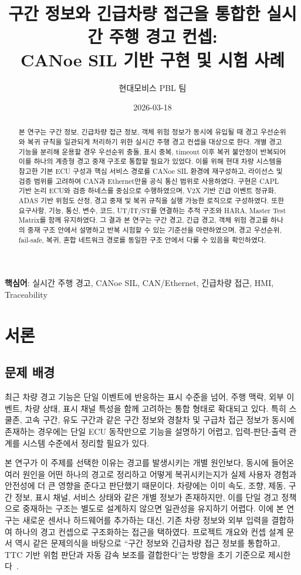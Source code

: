 \documentclass[10pt,a4paper,twocolumn]{article}
\title{구간 정보와 긴급차량 접근을 통합한 실시간 주행 경고 컨셉:\\CANoe SIL 기반 구현 및 시험 사례}
\author{현대모비스 PBL 팀}
\date{2026-03-18}
\begin{document}
\maketitle

\begin{abstract}
본 연구는 구간 정보, 긴급차량 접근 정보, 객체 위험 정보가 동시에 유입될 때 경고 우선순위와 복귀 규칙을 일관되게 처리하기 위한 실시간 주행 경고 컨셉을 대상으로 한다. 개별 경고 기능을 분리해 운용할 경우 우선순위 충돌, 표시 중복, timeout 이후 복귀 불안정이 반복되어 이를 하나의 계층형 경고 중재 구조로 통합할 필요가 있었다. 이를 위해 현대 차량 시스템을 참고한 기본 ECU 구성과 핵심 서비스 경로를 CANoe SIL 환경에 재구성하고, 라이선스 및 검증 범위를 고려하여 CAN과 Ethernet만을 공식 통신 범위로 사용하였다. 구현은 CAPL 기반 논리 ECU와 검증 하네스를 중심으로 수행하였으며, V2X 기반 긴급 이벤트 정규화, ADAS 기반 위험도 산정, 경고 중재 및 복귀 규칙을 실행 가능한 로직으로 구성하였다. 또한 요구사항, 기능, 통신, 변수, 코드, UT/IT/ST를 연결하는 추적 구조와 HARA, Master Test Matrix를 함께 유지하였다. 그 결과 본 연구는 구간 경고, 긴급 경고, 객체 위험 경고를 하나의 중재 구조 안에서 설명하고 반복 시험할 수 있는 기준선을 마련하였으며, 경고 우선순위, fail-safe, 복귀, 혼합 네트워크 경로를 동일한 구조 안에서 다룰 수 있음을 확인하였다.
\end{abstract}

\noindent\textbf{핵심어}: 실시간 주행 경고, CANoe SIL, CAN/Ethernet, 긴급차량 접근, HMI, Traceability

\section{서론}

\subsection{문제 배경}

최근 차량 경고 기능은 단일 이벤트에 반응하는 표시 수준을 넘어, 주행 맥락, 외부 이벤트, 차량 상태, 표시 채널 특성을 함께 고려하는 통합 형태로 확대되고 있다. 특히 스쿨존, 고속 구간, 유도 구간과 같은 구간 정보와 경찰차 및 구급차 접근 정보가 동시에 존재하는 경우에는 단일 ECU 동작만으로 기능을 설명하기 어렵고, 입력-판단-출력 관계를 시스템 수준에서 정리할 필요가 있다.

본 연구가 이 주제를 선택한 이유는 경고를 발생시키는 개별 원인보다, 동시에 들어온 여러 원인을 어떤 하나의 경고로 정리하고 어떻게 복귀시키는지가 실제 사용자 경험과 안전성에 더 큰 영향을 준다고 판단했기 때문이다. 차량에는 이미 속도, 조향, 제동, 구간 정보, 표시 채널, 서비스 상태와 같은 개별 정보가 존재하지만, 이를 단일 경고 정책으로 중재하는 구조는 별도로 설계하지 않으면 일관성을 유지하기 어렵다. 이에 본 연구는 새로운 센서나 하드웨어를 추가하는 대신, 기존 차량 정보와 외부 입력을 결합하여 하나의 경고 컨셉으로 구조화하는 접근을 택하였다. 프로젝트 개요와 컨셉 설계 문서 역시 같은 문제의식을 바탕으로 ``구간 정보와 긴급차량 접근 정보를 통합하고, TTC 기반 위험 판단과 자동 감속 보조를 결합한다''는 방향을 초기 기준으로 제시한다~\cite{proj_overview,concept_design}.
\end{document}
